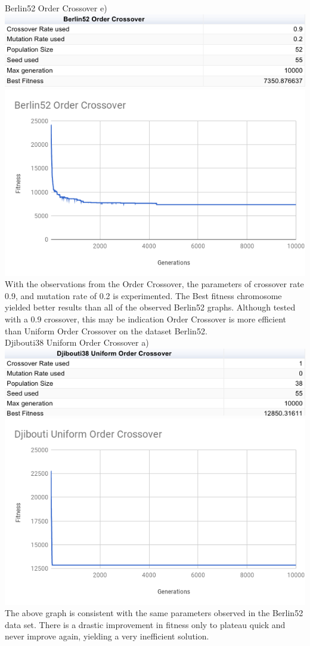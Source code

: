 \documentclass[conference]{IEEEtran}
\begin{document}
Berlin52 Order Crossover e)
\includegraphics[scale=0.42]{Berlin52/OC/Berlin52_OC_e)_table}
\includegraphics[scale=0.42]{Berlin52/OC/Berlin52_OC_e)}
With the observations from the Order Crossover, the parameters of crossover rate 0.9, and mutation rate of 0.2 is experimented. The Best fitness chromosome yielded better results than all of the observed Berlin52 graphs. Although tested with a 0.9 crossover, this may be indication Order Crossover is more efficient than Uniform Order Crossover on the dataset Berlin52.\\


Djibouti38 Uniform Order Crossover a)
\includegraphics[scale=0.42]{Djibouti38/UOC/Djibouti38_UOC_a)_table}
\includegraphics[scale=0.42]{Djibouti38/UOC/Djibouti38_UOC_a)}
The above graph is consistent with the same parameters observed in the Berlin52 data set. There is a drastic improvement in fitness only to plateau quick and never improve again, yielding a very inefficient solution.\\
\end{document}

